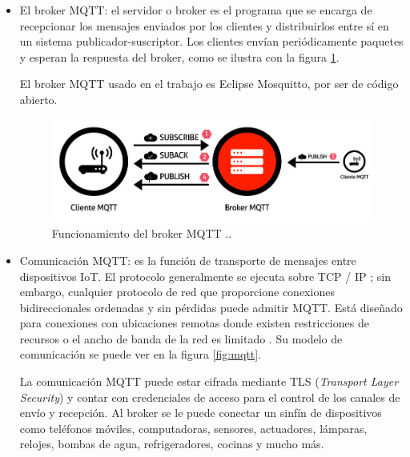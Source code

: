 \begin{itemize}
\item El broker MQTT: el servidor o broker es el programa que se encarga de recepcionar los mensajes enviados por los clientes y distribuirlos entre sí en un sistema publicador-suscriptor. Los clientes envían periódicamente paquetes y esperan la respuesta del broker, como se ilustra con la figura \ref{fig:broker}. 

El broker MQTT usado en el trabajo es Eclipse Mosquitto, por ser de código abierto.

\vspace{0.5cm}

\begin{figure}[htbp]
	\centering
	\includegraphics[width=.8\textwidth]{./Figures/broker.jpg}
	\caption{Funcionamiento del broker MQTT \protect\footnotemark..}
	\label{fig:broker}
\end{figure}



\item Comunicación MQTT: es la función de transporte de mensajes entre dispositivos IoT. El protocolo generalmente se ejecuta sobre TCP / IP ; sin embargo, cualquier protocolo de red que proporcione conexiones bidireccionales ordenadas y sin pérdidas puede admitir MQTT. Está diseñado para conexiones con ubicaciones remotas donde existen restricciones de recursos o el ancho de banda de la red es limitado \citep{WEBSITE:3}. Su modelo de comunicación se puede ver en la figura \ref{fig:mqtt}.




La comunicación MQTT puede estar cifrada mediante TLS (\emph{Transport Layer Security}) y contar con credenciales de acceso para el control de los canales de envío y recepción. Al broker se le puede conectar un sinfín de dispositivos como teléfonos móviles, computadoras, sensores, actuadores, lámparas, relojes, bombas de agua, refrigeradores, cocinas y mucho más. 


\end{itemize}
